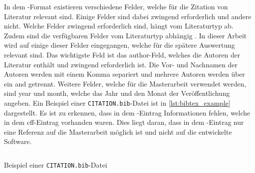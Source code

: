 In dem -Format existieren verschiedene Felder, welche für die Zitation von Literatur relevant sind.
Einige Felder sind dabei zwingend erforderlich und andere nicht.
Welche Felder zwingend erforderlich sind, hängt vom Literaturtyp ab.
Zudem sind die verfügbaren Felder vom Literaturtyp abhängig \autocite{patashnik_bibtexing_1988}.
In dieser Arbeit wird auf einige dieser Felder eingegangen, welche für die spätere Auswertung relevant sind.
Das wichtigste Feld ist das \glqq author\grqq{}-Feld, welches die Autoren der Literatur enthält und zwingend erforderlich ist.
Die Vor- und Nachnamen der Autoren werden mit einem Komma separiert und mehrere Autoren werden über ein \glqq and\grqq{} getrennt.
Weitere Felder, welche für die Masterarbeit verwendet werden, sind \glqq year\grqq{} und \glqq month\grqq{}, welche das Jahr und den Monat der Veröffentlichung angeben.
Ein Beispiel einer \texttt{CITATION.bib}-Datei ist in \autoref{lst:bibtex_example} dargestellt.
Es ist zu erkennen, dass in dem -Eintrag Informationen fehlen, welche in dem \gls{cff}-Eintrag vorhanden waren.
Dies liegt daran, dass in dem -Eintrag nur eine Referenz auf die Masterarbeit möglich ist und nicht auf die entwickelte Software.

\begin{listing}
  \inputminted{text}{../CITATION.bib}
  \caption{Beispiel einer \texttt{CITATION.bib}-Datei}
  \label{lst:bibtex_example}
\end{listing}
